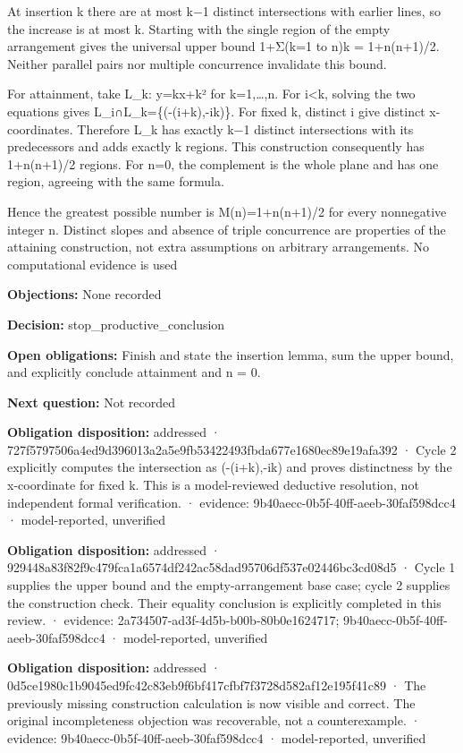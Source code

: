 \documentclass[11pt]{article}
\begin{document}
At insertion k there are at most k−1 distinct intersections with earlier lines, so the increase is at most k. Starting with the single region of the empty arrangement gives the universal upper bound 1+Σ(k=1 to n)k = 1+n(n+1)/2. Neither parallel pairs nor multiple concurrence invalidate this bound.

For attainment, take L\_k: y=kx+k² for k=1,…,n. For i\textless{}k, solving the two equations gives L\_i∩L\_k=\{(-(i+k),-ik)\}. For fixed k, distinct i give distinct x-coordinates. Therefore L\_k has exactly k−1 distinct intersections with its predecessors and adds exactly k regions. This construction consequently has 1+n(n+1)/2 regions. For n=0, the complement is the whole plane and has one region, agreeing with the same formula.

Hence the greatest possible number is M(n)=1+n(n+1)/2 for every nonnegative integer n. Distinct slopes and absence of triple concurrence are properties of the attaining construction, not extra assumptions on arbitrary arrangements. No computational evidence is used\par
\textbf{Objections:} None recorded\par
\textbf{Decision:} stop\_productive\_conclusion\par
\textbf{Open obligations:} Finish and state the insertion lemma, sum the upper bound, and explicitly conclude attainment and n = 0.\par
\textbf{Next question:} Not recorded\par
\textbf{Obligation disposition:} addressed · 727f5797506a4ed9d396013a2a5e9fb53422493fbda677e1680ec89e19afa392 · Cycle 2 explicitly computes the intersection as (-(i+k),-ik) and proves distinctness by the x-coordinate for fixed k. This is a model-reviewed deductive resolution, not independent formal verification. · evidence: 9b40aecc-0b5f-40ff-aeeb-30faf598dcc4 · model-reported, unverified\par
\textbf{Obligation disposition:} addressed · 929448a83f82f9c479fca1a6574df242ac58dad95706df537e02446bc3cd08d5 · Cycle 1 supplies the upper bound and the empty-arrangement base case; cycle 2 supplies the construction check. Their equality conclusion is explicitly completed in this review. · evidence: 2a734507-ad3f-4d5b-b00b-80b0e1624717; 9b40aecc-0b5f-40ff-aeeb-30faf598dcc4 · model-reported, unverified\par
\textbf{Obligation disposition:} addressed · 0d5ce1980c1b9045ed9fc42c83eb9f6bf417cfbf7f3728d582af12e195f41c89 · The previously missing construction calculation is now visible and correct. The original incompleteness objection was recoverable, not a counterexample. · evidence: 9b40aecc-0b5f-40ff-aeeb-30faf598dcc4 · model-reported, unverified\par
\end{document}
